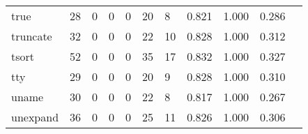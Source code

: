 \begin{longtable}{lp{1.20cm}p{1.20cm}p{1.20cm}p{1.20cm}p{1.20cm}p{1.20cm}p{1.20cm}p{1.20cm}p{1.20cm}p{1.20cm}}
true      &                                    28 &                                                  0 &                                                  0 &                                                  0 &                                                 20 &                                                  8 &                                         0.821 &                                              1.000 &                                              0.286 \\
truncate  &                                    32 &                                                  0 &                                                  0 &                                                  0 &                                                 22 &                                                 10 &                                         0.828 &                                              1.000 &                                              0.312 \\
tsort     &                                    52 &                                                  0 &                                                  0 &                                                  0 &                                                 35 &                                                 17 &                                         0.832 &                                              1.000 &                                              0.327 \\
tty       &                                    29 &                                                  0 &                                                  0 &                                                  0 &                                                 20 &                                                  9 &                                         0.828 &                                              1.000 &                                              0.310 \\
uname     &                                    30 &                                                  0 &                                                  0 &                                                  0 &                                                 22 &                                                  8 &                                         0.817 &                                              1.000 &                                              0.267 \\
unexpand  &                                    36 &                                                  0 &                                                  0 &                                                  0 &                                                 25 &                                                 11 &                                         0.826 &                                              1.000 &                                              0.306 \\

\end{longtable}
